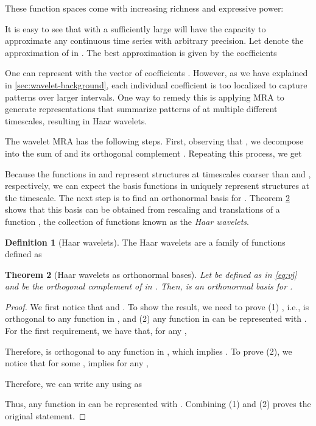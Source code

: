 \documentclass{article}
\theoremstyle{plain}
\newtheorem{theorem}{Theorem}[section]
\theoremstyle{definition}
\newtheorem{definition}[theorem]{Definition}
\theoremstyle{remark}
\begin{document}
These function spaces come with increasing richness and expressive power:

It is easy to see that  with a sufficiently large  will have the capacity to approximate any continuous time series  with arbitrary precision. 
Let  denote the approximation of  in . 
The best approximation is given by the coefficients

One can represent  with the vector of coefficients . 
However, as we have explained in \cref{sec:wavelet-background}, each individual coefficient is too localized to capture patterns over larger intervals. 
One way to remedy this is applying MRA to generate representations that summarize patterns of  at multiple different timescales, resulting in Haar wavelets.

The wavelet MRA has the following steps. 
First, observing that , we decompose  into the sum of  and its orthogonal complement . 
Repeating this process, we get  

Because the functions in  and  represent structures at timescales coarser than  and , respectively, 
we can expect the basis functions in  uniquely represent structures at the  timescale. 
The next step is to find an orthonormal basis for . 
Theorem \ref{thm:wavelet} shows that this basis 
can be obtained from rescaling and translations of a function , the collection of functions known as the \emph{Haar wavelets}. 

\begin{definition}[Haar wavelets] \label{def:haar-wavelets}
    The Haar wavelets are a family of functions defined as
    
\end{definition}

\begin{theorem}[Haar wavelets as orthonormal bases] \label{thm:wavelet}
    Let  be defined as in \eqref{eq:vj} and  be the orthogonal complement of  in . 
    Then,  is an orthonormal basis for . 
\end{theorem}

\begin{proof}
    We first notice that  and . 
    To show the result, we need to prove (1) , i.e.,  is orthogonal to any function in , and (2) any function in  can be represented with . 
    For the first requirement, we have that, for any ,
    
    Therefore,  is orthogonal to any function in , which implies . 
To prove (2), we notice that for some ,  implies for any ,

Therefore, we can write any  using  as 

Thus, any function in  can be represented with . 
Combining (1) and (2) proves the original statement. 
\end{proof}
\end{document}
